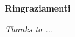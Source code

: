\thispagestyle{empty}

\begin{center}
  {\bf \Huge Ringraziamenti}
\end{center}

\vspace{4cm}
\emph{Thanks to ...}